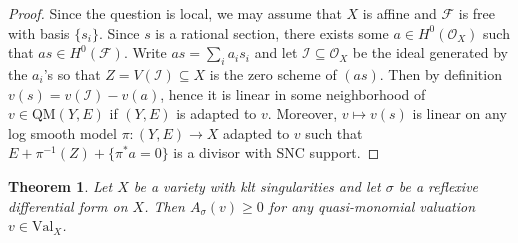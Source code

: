 \documentclass[12pt]{amsart}
\newtheorem{thm}[prop]{Theorem}
\newtheorem{lem}[prop]{Lemma}
\theoremstyle{definition}
\newcommand{\cO}{\mathcal{O}}
\newcommand{\cI}{\mathcal{I}}
\newcommand{\cF}{\mathcal{F}}
\newcommand{\ord}{\mathrm{ord}}
\newcommand{\Val}{\mathrm{Val}}
\newcommand{\QM}{\mathrm{QM}}
\numberwithin{equation}{section}
\begin{document}
\begin{proof}
Since the question is local, we may assume that $X$ is affine and $\cF$ is free with basis $\{s_i\}$. Since $s$ is a rational section, there exists some $a\in H^0(\cO_X)$ such that $a s\in H^0(\cF)$. Write $as=\sum_i a_i s_i$ and let $\cI\subseteq \cO_X$ be the ideal generated by the $a_i$'s so that $Z=V(\cI)\subseteq X$ is the zero scheme of $(as)$. Then by definition $v(s) = v(\cI)-v(a)$, hence it is linear in some neighborhood of $v\in \QM(Y,E)$ if $(Y,E)$ is adapted to $v$. Moreover, $v\mapsto v(s)$ is linear on any log smooth model $\pi\colon(Y,E)\to X$ adapted to $v$ such that $E+\pi^{-1}(Z)+\{\pi^*a=0\}$ is a divisor with SNC support.
\end{proof}





\begin{thm} \label{thm:log disc>=0}
Let $X$ be a variety with klt singularities and let $\sigma$ be a reflexive differential form on $X$. Then $A_{\sigma}(v)\ge 0$ for any quasi-monomial valuation $v\in \Val_X$.
\end{thm}
\end{document}
